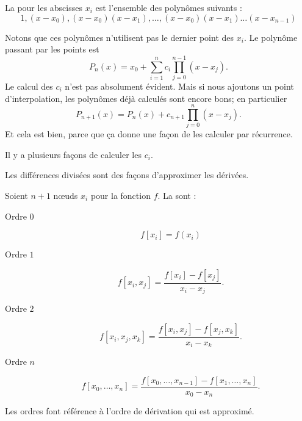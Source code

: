 \begin{definition}
    La  pour les abscisses \( x_i\) est l'ensemble des polynômes suivants :
    \begin{equation}
        1,(x-x_0),(x-x_0)(x-x_1),\ldots,(x-x_0)(x-x_1)\ldots (x-x_{n-1})
    \end{equation}
\end{definition}
Notons que ces polynômes n'utilisent pas le dernier point des \( x_i\). Le polynôme passant par les points est 
\begin{equation}
    P_n(x)=x_0+\sum_{i=1}^nc_i\prod_{j=0}^{n-1}(x-x_j).
\end{equation}
Le calcul des \( c_i\) n'est pas absolument évident. Mais si nous ajoutons un point d'interpolation, les polynômes déjà calculés sont encore bons; en particulier
\begin{equation}
    P_{n+1}(x)=P_n(x)+c_{n+1}\prod_{j=0}^{n}(x-x_j).
\end{equation}
Et cela est bien, parce que ça donne une façon de les calculer par récurrence.

Il y a plusieurs façons de calculer les \( c_i\).

Les différences divisées sont des façons d'approximer les dérivées.
\begin{definition}
    Soient \( n+1\) nœuds \( x_i\) pour la fonction \( f\). La  sont :
    \begin{description}
        \item[Ordre \( 0\)]  
            \begin{equation}
                f[x_i]=f(x_i)
            \end{equation}
        \item[Ordre \( 1\)]
            \begin{equation}
                f[x_i,x_j]=\frac{ f[x_i]-f[x_j] }{ x_i-x_j }.
            \end{equation}
        \item[Ordre \( 2\)]
            \begin{equation}
                f[x_i,x_j,x_k]=\frac{ f[x_i,x_j]-f[x_j,x_k] }{ x_i-x_k }.
            \end{equation}
        \item[Ordre \( n\)]
            \begin{equation}
                f[x_0,\ldots, x_n]=\frac{ f[x_0,\ldots, x_{n-1}]-f[x_1,\ldots, x_n] }{ x_0-x_n }.
            \end{equation}
    \end{description}
\end{definition}
Les ordres font référence à l'ordre de dérivation qui est approximé.

